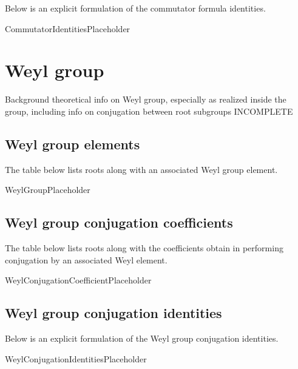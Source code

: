 \documentclass[11pt]{article}
\newcommand{\noi}{\noindent}
\theoremstyle{definition}
\begin{document}
\noi Below is an explicit formulation of the commutator formula identities.

CommutatorIdentitiesPlaceholder

\newpage
\section{Weyl group}

\noi Background theoretical info on Weyl group, especially as realized inside the group, including info on conjugation between root subgroups INCOMPLETE

\subsection{Weyl group elements}

\noi The table below lists roots along with an associated Weyl group element.

WeylGroupPlaceholder

\subsection{Weyl group conjugation coefficients}

\noi The table below lists roots along with the coefficients obtain in performing conjugation by an associated Weyl element.

WeylConjugationCoefficientPlaceholder

\subsection{Weyl group conjugation identities}

\noi Below is an explicit formulation of the Weyl group conjugation identities.

WeylConjugationIdentitiesPlaceholder
\end{document}
